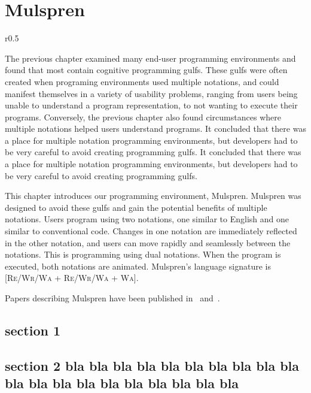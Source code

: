 \documentclass[12pt]{report}
\newcommand{\LangSig}[1]{\textsc{[#1]}} %
\begin{document}
\dominitoc
\tableofcontents
\chapter{Mulspren}\label{chapter+mulspren}
\begin{wrapfigure}{r}{0.5\linewidth}
\begin{minipage}{\linewidth}
\vspace{-2.\baselineskip}
\minitoc
\vspace{-1.\baselineskip}
\end{minipage}
\end{wrapfigure}
The previous chapter examined many end-user programming environments
and found that most contain cognitive programming gulfs.
These gulfs were often created when programing environments used
multiple notations, and could manifest themselves in a variety of
usability problems, ranging from users being unable to understand
a program representation, to not wanting to execute their programs.
Conversely, the previous chapter also found circumstances where multiple
notations helped users understand programs.
It concluded that there was a place for multiple notation programming
environments, but developers had to be very careful to avoid creating
programming gulfs.
It concluded that there was a place for multiple notation programming
environments, but developers had to be very careful to avoid creating
programming gulfs.

This chapter introduces our programming environment, Mulspren.
Mulspren was designed to avoid these gulfs and gain the potential
benefits of multiple notations.
Users program using two notations, one similar to English and one
similar to conventional code.
Changes in one notation are immediately reflected in the other notation,
and users can move rapidly and seamlessly between the notations.
This is programming using dual notations.
When the program is executed, both notations are animated.
Mulspren's language signature is \LangSig{Re/Wr/Wa + Re/Wr/Wa + Wa}.

Papers describing Mulspren have been published in~\cite{Wright02-2}
and~\cite{Wright03-3}.

\section{section 1}
\section{section 2 bla bla bla bla bla bla bla bla bla bla bla
bla bla bla bla bla bla bla bla bla}
\end{document}
